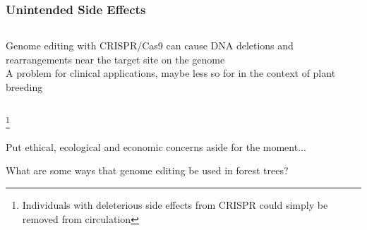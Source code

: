 \documentclass[xcolor=dvipsnames]{beamer}
\newcommand\blfootnote[1]{%
	\begingroup
	\renewcommand\thefootnote{}\footnote{#1}%
	\addtocounter{footnote}{-1}%
	\endgroup
}
\begin{document}
\begin{frame}
	\frametitle{Unintended Side Effects}
	
	\begin{columns}
		\begin{column}{0.5\textwidth}
Genome editing with CRISPR/Cas9 can cause DNA deletions and rearrangements near the target site on the genome\\
\vspace{15pt}
A problem for clinical applications, maybe less so for in the context of plant breeding

		\end{column}
		\begin{column}{0.5\textwidth}
				\\
\end{column}
	\end{columns}
	\blfootnote{Individuals with deleterious side effects from CRISPR could simply be removed from circulation}
\end{frame}



\begin{frame}
	
	\scriptsize{Put ethical, ecological and economic concerns aside for the moment...}
	
	\Huge{What are some ways that genome editing be used in forest trees?}
	
\end{frame}
\end{document}
